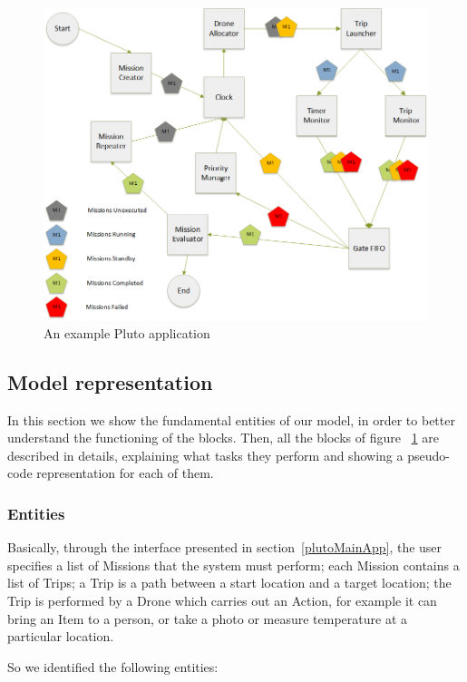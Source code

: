 \begin{figure}[htb]
  \centering
  \includegraphics[width=\linewidth]{pictures/BlocksDiagram.png}
  \caption{An example Pluto application}
  \label{fig:BlocksDiagram}
\end{figure}


\newpage
\subsection{Model representation}
\label{modelRepresentation}
In this section we show the fundamental entities of our model, in order to better understand the functioning of the blocks. Then, all the blocks of figure ~\ref{fig:BlocksDiagram} are described in details, explaining what tasks they perform and showing a pseudo-code representation for each of them.

\subsubsection {Entities}
\label{entities}

Basically, through the interface presented in section~\ref{plutoMainApp}, the user specifies a list of Missions that the system must perform; each Mission contains a list of Trips; a Trip is a path between a start location and a target location; the Trip is performed by a Drone which carries out an Action, for example it can bring an Item to a person, or take a photo or measure temperature at a particular location.

So we identified the following entities:

